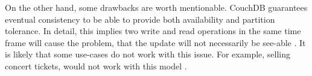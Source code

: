 \newline
On the other hand, some drawbacks are worth mentionable.
CouchDB guarantees eventual consistency to be able to provide both availability and partition tolerance. In detail, this implies two write and read operations in the same time frame will cause the problem, that the update will not necessarily be see-able \parencite{EminGunSirer}.
It is likely that some use-cases do not work with this issue. For example, selling concert tickets, would not work with this model \parencite{EminGunSirer}. \\
%
%
%
